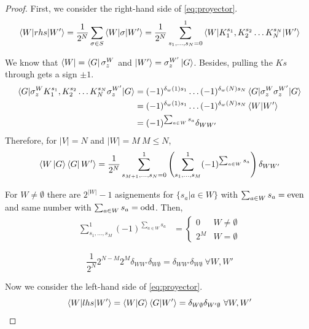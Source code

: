 \documentclass[10pt,a4paper]{book}
\numberwithin{equation}{chapter}
\numberwithin{figure}{chapter}
\numberwithin{table}{chapter}
\begin{document}
\begin{proof}
First, we consider the right-hand side of \autoref{eq:proyector}.
\begin{equation}
\braket{W|rhs|W'}=\frac{1}{2^N}\sum_{\sigma \in S} \braket{W|\sigma |W'}= \frac{1}{2^N}\sum^{1}_{s_{1},\ldots, s_{N}=0} \braket{W|K^{s_1}_{1},K^{s_2}_{2} \ldots K^{s_N}_{N} |W'}
\end{equation}

We know that $\bra{W}=\bra{G}\sigma^{W}_{z}$ and $\ket{W'}=\sigma^{W'}_{z}\ket{G}$. Besides, pulling the $Ks$ through gets a sign $\pm 1$. 
\begin{align}
\braket{G|\sigma^{W}_{z}K^{s_1}_{1},K^{s_2}_{2} \ldots K^{s_N}_{N}\sigma^{W'}_{z}|G}&= (-1)^{\delta_{w}(1)s_1}\ldots (-1)^{\delta_{w}(N)s_N}\braket{G|\sigma^{W}_{z}\sigma^{W'}_{z}|G} \\
&= \nonumber (-1)^{\delta_{w}(1)s_1}\ldots (-1)^{\delta_{w}(N)s_N} \braket{W|W'} \\
&= (-1)^{\sum_{a \in W}s_a}\delta_{WW'}
\end{align}
Therefore, for $|V|=N$ and $|W|=M \ M \leq N$, 
\begin{equation}
\braket{W \ket{G}\bra{G} W'}= \frac{1}{2^N}\sum^{1}_{s_{M+1}, \ldots, s_{N}=0}\left( \sum^{1}_{s_{1}, \ldots, s_{M}} (-1)^{\sum_{a \in W}s_a}\right) \delta_{WW'}
\end{equation}

For $W\neq \emptyset$ there are $2^{|W|}-1$ asignements for $\lbrace s_{a} | a \in W\rbrace$ with $\sum_{a \in W}s_a= \textup{even}$ and same number with $\sum_{a \in W}s_a= \textup{odd}$. Then, 
\begin{align}
\sum^{1}_{s_{1}, \ldots, s_{M}} (-1)^{\sum_{a \in W}s_a} &= \left\lbrace \begin{array}{cc} 0 & W \neq\emptyset \\ 2^{M} & W=\emptyset \end{array}
\end{align}


\begin{equation}
\frac{1}{2^N} 2^{N-M} 2^{M}\delta_{WW'}\delta_{W\emptyset}= \delta_{WW'}\delta_{W\emptyset} \ \forall W,W'
\end{equation} 

Now we consider the left-hand side of \autoref{eq:proyector}.
\begin{equation}
\braket{W|lhs|W'}=\braket{W|G}\braket{G|W'} = \delta_{W\emptyset} \delta_{W' \emptyset} \ \forall W,W' 
\end{equation}
\end{proof}
\end{document}
